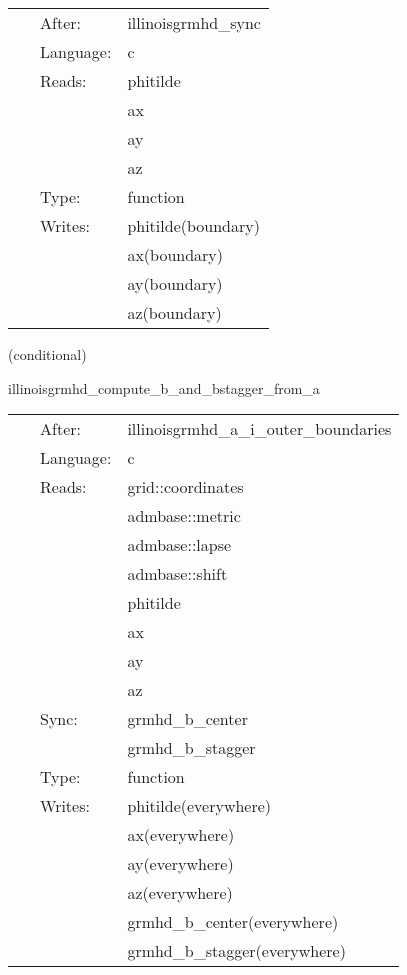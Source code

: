 \documentclass{article}
\begin{document}
 \begin{tabular*}{160mm}{cll} 
~ & After:  & illinoisgrmhd\_sync \\ 
~ & Language:  & c \\ 
~ & Reads:  & phitilde \\ 
~& ~ &ax\\ 
~& ~ &ay\\ 
~& ~ &az\\ 
~ & Type:  & function \\ 
~ & Writes:  & phitilde(boundary) \\ 
~& ~ &ax(boundary)\\ 
~& ~ &ay(boundary)\\ 
~& ~ &az(boundary)\\ 
\end{tabular*} 


\vspace{5mm}

   (conditional) 

\hspace{5mm} illinoisgrmhd\_compute\_b\_and\_bstagger\_from\_a 

\hspace{5mm}{\it compute b and b\_stagger from a sync: grmhd\_primitives\_bi,grmhd\_primitives\_bi\_stagger } 


\hspace{5mm}

 \begin{tabular*}{160mm}{cll} 
~ & After:  & illinoisgrmhd\_a\_i\_outer\_boundaries \\ 
~ & Language:  & c \\ 
~ & Reads:  & grid::coordinates \\ 
~& ~ &admbase::metric\\ 
~& ~ &admbase::lapse\\ 
~& ~ &admbase::shift\\ 
~& ~ &phitilde\\ 
~& ~ &ax\\ 
~& ~ &ay\\ 
~& ~ &az\\ 
~ & Sync:  & grmhd\_b\_center \\ 
~& ~ &grmhd\_b\_stagger\\ 
~ & Type:  & function \\ 
~ & Writes:  & phitilde(everywhere) \\ 
~& ~ &ax(everywhere)\\ 
~& ~ &ay(everywhere)\\ 
~& ~ &az(everywhere)\\ 
~& ~ &grmhd\_b\_center(everywhere)\\ 
~& ~ &grmhd\_b\_stagger(everywhere)\\ 
\end{tabular*} 
\end{document}
